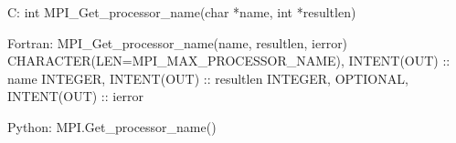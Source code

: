 C:
int MPI_Get_processor_name(char *name, int *resultlen)

Fortran:
MPI_Get_processor_name(name, resultlen, ierror)
CHARACTER(LEN=MPI_MAX_PROCESSOR_NAME), INTENT(OUT) :: name
INTEGER, INTENT(OUT) :: resultlen
INTEGER, OPTIONAL, INTENT(OUT) :: ierror 

Python:
MPI.Get_processor_name()
